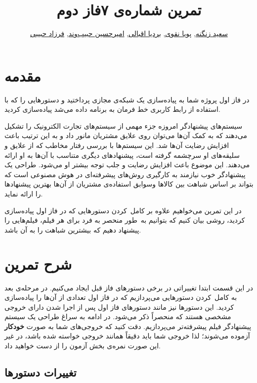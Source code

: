 \documentclass{utap}
\title{تمرین شماره‌ی ۷\normalsize\qquad فاز دوم}
\author{%
    \href{mailto:zangenehsaeed412@gmail.com?subject=[AP\%20S98\%20A7]\%20}{سعید زنگنه},
    \href{mailto:naghavi.pooya@gmail.com?subject=[AP\%20S98\%20A7]\%20}{پویا نقوی},
    \href{mailto:bardia.eghbali@gmail.com?subject=[AP\%20S98\%20A7]\%20}{بردیا اقبالی},
    \href{mailto:ahhabibvand@gmail.com?subject=[AP\%20S98\%20A7]\%20}{امیرحسین حبیب‌وند},
    \href{mailto:farzadhabibii98@gmail.com?subject=[AP\%20S98\%20A7]\%20}{فرزاد حبیبی}
}
\begin{document}
    \maketitle

    \section{مقدمه}

    در فاز اول پروژه شما به پیاده‌سازی یک شبکه‌ی مجازی پرداختید و دستورهایی را که با استفاده از رابط کاربری خط فرمان به برنامه داده می‌شد پیاده‌سازی کردید.

    سیستم‌های پیشنهادگر امروزه جزء مهمی از سیستم‌های تجارت الکترونیک را تشکیل می‌دهند که به کمک آن‌ها می‌توان روی علایق مشتریان مانور داد و به این ترتیب باعث افزایش رضایت آن‌ها شد. این سیستم‌ها با بررسی رفتار مخاطب که از علایق و سلیقه‌های او سرچشمه گرفته است، پیشنهاد‌های دیگری متناسب با آن‌ها به او ارائه می‌دهند. این موضوع باعث افزایش رضایت و جلب توجه بیشتر او می‌شود.
    طراحی یک پیشنهاد‌گر خوب نیازمند به کارگیری روش‌های پیشرفته‌ای در هوش مصنوعی است که بتواند بر اساس شباهت‌ بین کالاها وسوابق استفاده‌ی مشتریان از آن‌ها بهترین پیشنهاد‌ها را ارائه نماید.

    در این تمرین می‌خواهیم علاوه بر کامل~کردن دستورهایی که در فاز اول پیاده‌سازی کردید، روشی بیان کنیم که بتوانیم به~طور منحصر به فرد برای هر فیلم، فیلم‌هایی را پیشنهاد دهیم که بیشترین شباهت را به آن باشد.

    \section{شرح تمرین}

    در این قسمت ابتدا تغییراتی در برخی دستورهای فاز قبل ایجاد می‌کنیم.
    در مرحله‌ی بعد به کامل~کردن دستورهایی می‌پردازیم که در فاز اول تعدادی از آن‌ها را پیاده‌سازی کردید. این دستورها نیز مانند دستورهای فاز اول پس از اجرا شدن دارای خروجی مشخصی هستند که منحصراً ذکر می‌شود.
    در ادامه به سراغ طراحی یک سیستم پیشنهادگر فیلم پیشرفته‌تر می‌پردازیم.
    دقت کنید که خروجی‌های شما به صورت \textbf{خودکار} آزموده می‌شوند؛ لذا خروجی شما باید دقیقاً همانند خروجی خواسته شده باشد، در غیر این صورت نمره‌ی بخش آزمون را از دست خواهید داد.

    \subsection{تغییرات دستورها}
\end{document}
